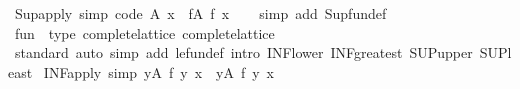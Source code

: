 \begin{isabellebody}
\isanewline
{}\isamarkupfalse%
\ Sup{\isacharunderscore}{\kern0pt}apply\ {\isacharbrackleft}{\kern0pt}simp{\isacharcomma}{\kern0pt}\ code{\isacharbrackright}{\kern0pt}{\isacharcolon}{\kern0pt}\ {\isachardoublequoteopen}{\isacharparenleft}{\kern0pt}{\isasymSqunion}A{\isacharparenright}{\kern0pt}\ x\ {\isacharequal}{\kern0pt}\ {\isacharparenleft}{\kern0pt}{\isasymSqunion}f{\isasymin}A{\isachardot}{\kern0pt}\ f\ x{\isacharparenright}{\kern0pt}{\isachardoublequoteclose}\isanewline
%
\isadelimproof
\ \ %
\endisadelimproof
%
\isatagproof
{}\isamarkupfalse%
\ {\isacharparenleft}{\kern0pt}simp\ add{\isacharcolon}{\kern0pt}\ Sup{\isacharunderscore}{\kern0pt}fun{\isacharunderscore}{\kern0pt}def{\isacharparenright}{\kern0pt}%
\endisatagproof
{\isafoldproof}%
%
\isadelimproof
\isanewline
%
\endisadelimproof
\isanewline
{}\isamarkupfalse%
%
\isadelimproof
\ %
\endisadelimproof
%
\isatagproof
\isacommand{{\isachardot}{\kern0pt}{\isachardot}{\kern0pt}}\isamarkupfalse%
%
\endisatagproof
{\isafoldproof}%
%
\isadelimproof
%
\endisadelimproof
\isanewline
\isanewline
{}\isamarkupfalse%
\isanewline
\isanewline
{}\isamarkupfalse%
\ {\isachardoublequoteopen}fun{\isachardoublequoteclose}\ {\isacharcolon}{\kern0pt}{\isacharcolon}{\kern0pt}\ {\isacharparenleft}{\kern0pt}type{\isacharcomma}{\kern0pt}\ complete{\isacharunderscore}{\kern0pt}lattice{\isacharparenright}{\kern0pt}\ complete{\isacharunderscore}{\kern0pt}lattice\isanewline
{}\isanewline
\isanewline
{}\isamarkupfalse%
\isanewline
%
\isadelimproof
\ \ %
\endisadelimproof
%
\isatagproof
{}\isamarkupfalse%
\ standard\ {\isacharparenleft}{\kern0pt}auto\ simp\ add{\isacharcolon}{\kern0pt}\ le{\isacharunderscore}{\kern0pt}fun{\isacharunderscore}{\kern0pt}def\ intro{\isacharcolon}{\kern0pt}\ INF{\isacharunderscore}{\kern0pt}lower\ INF{\isacharunderscore}{\kern0pt}greatest\ SUP{\isacharunderscore}{\kern0pt}upper\ SUP{\isacharunderscore}{\kern0pt}least{\isacharparenright}{\kern0pt}%
\endisatagproof
{\isafoldproof}%
%
\isadelimproof
\isanewline
%
\endisadelimproof
\isanewline
{}\isamarkupfalse%
\isanewline
\isanewline
{}\isamarkupfalse%
\ INF{\isacharunderscore}{\kern0pt}apply\ {\isacharbrackleft}{\kern0pt}simp{\isacharbrackright}{\kern0pt}{\isacharcolon}{\kern0pt}\ {\isachardoublequoteopen}{\isacharparenleft}{\kern0pt}{\isasymSqinter}y{\isasymin}A{\isachardot}{\kern0pt}\ f\ y{\isacharparenright}{\kern0pt}\ x\ {\isacharequal}{\kern0pt}\ {\isacharparenleft}{\kern0pt}{\isasymSqinter}y{\isasymin}A{\isachardot}{\kern0pt}\ f\ y\ x{\isacharparenright}{\kern0pt}{\isachardoublequoteclose}\isanewline

\end{isabellebody}
